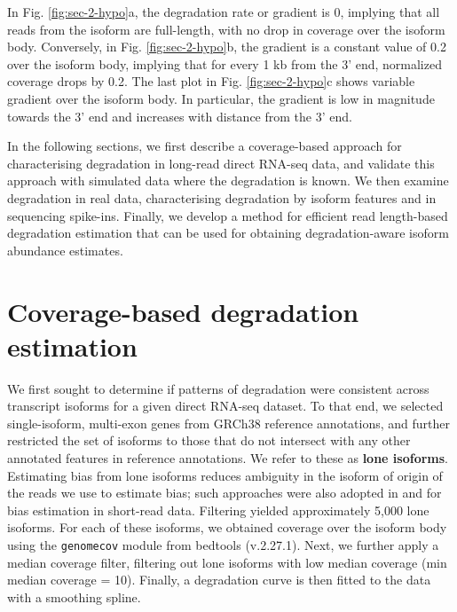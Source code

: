 In Fig. \ref{fig:sec-2-hypo}a, the degradation rate or gradient is 0, implying that all reads from the isoform are full-length, with no drop in coverage over the isoform body. Conversely, in Fig. \ref{fig:sec-2-hypo}b, the gradient is a constant value of 0.2 over the isoform body, implying that for every 1 kb from the 3' end, normalized coverage drops by 0.2. The last plot in Fig. \ref{fig:sec-2-hypo}c shows variable gradient over the isoform body. In particular, the gradient is low in magnitude towards the 3' end and increases with distance from the 3' end.  

In the following sections, we first describe a coverage-based approach for characterising degradation in long-read direct RNA-seq data, and validate this approach with simulated data where the degradation is known. We then examine degradation in real data, characterising degradation by isoform features and in sequencing spike-ins. Finally, we develop a method for efficient read length-based degradation estimation that can be used for obtaining degradation-aware isoform abundance estimates.

\section{Coverage-based degradation estimation}\label{sec:deg-est}

We first sought to determine if patterns of degradation were consistent across transcript isoforms for a given direct RNA-seq dataset. To that end, we selected single-isoform, multi-exon genes from GRCh38 reference annotations, and further restricted the set of isoforms to those that do not intersect with any other annotated features in reference annotations. We refer to these as \textbf{lone isoforms}. Estimating bias from lone isoforms reduces ambiguity in the isoform of origin of the reads we use to estimate bias; such approaches were also adopted in \cite{Roberts2011} and \cite{Love2016} for bias estimation in short-read data. Filtering yielded approximately 5,000 lone isoforms. For each of these isoforms, we obtained coverage over the isoform body using the \texttt{genomecov} module from bedtools (v.2.27.1). Next, we further apply a median coverage filter, filtering out lone isoforms with low median coverage (min median coverage = 10). Finally, a degradation curve is then fitted to the data with a smoothing spline.  

